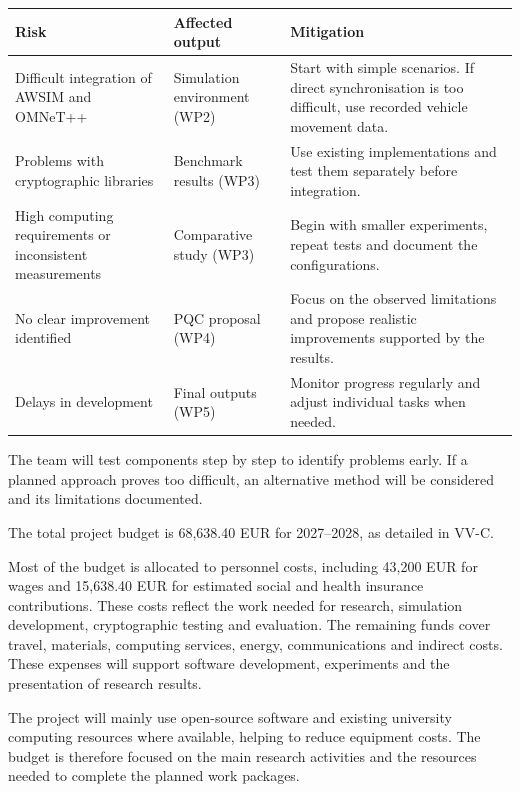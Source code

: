 \documentclass[10pt,a4paper]{article}
\newcommand{\medsec}[1]{\par\needspace{3\baselineskip}\vspace{6pt}\noindent{\large\sffamily\bfseries\color{navy}#1}\par\vspace{3pt}}
\begin{document}
\par\medskip\noindent\small\begin{tabular}{@{}L{49.40mm}L{41.16mm}L{74.10mm}@{}}
\toprule
\textbf{Risk} & \textbf{Affected output} & \textbf{Mitigation} \\
\midrule
Difficult integration of AWSIM and OMNeT++ & Simulation environment (WP2) & Start with simple scenarios. If direct synchronisation is too difficult, use recorded vehicle movement data. \\
Problems with cryptographic libraries & Benchmark results (WP3) & Use existing implementations and test them separately before integration. \\
High computing requirements or inconsistent measurements & Comparative study (WP3) & Begin with smaller experiments, repeat tests and document the configurations. \\
No clear improvement identified & PQC proposal (WP4) & Focus on the observed limitations and propose realistic improvements supported by the results. \\
Delays in development & Final outputs (WP5) & Monitor progress regularly and adjust individual tasks when needed. \\
\bottomrule\end{tabular}\normalsize\par\medskip
The team will test components step by step to identify problems early. If a planned approach proves too difficult, an alternative method will be considered and its limitations documented.\par

\medsec{3.4 Budget Justification}
The total project budget is 68,638.40 EUR for 2027--2028, as detailed in VV-C.\par

Most of the budget is allocated to personnel costs, including 43,200 EUR for wages and 15,638.40 EUR for estimated social and health insurance contributions. These costs reflect the work needed for research, simulation development, cryptographic testing and evaluation. The remaining funds cover travel, materials, computing services, energy, communications and indirect costs. These expenses will support software development, experiments and the presentation of research results.\par

The project will mainly use open-source software and existing university computing resources where available, helping to reduce equipment costs. The budget is therefore focused on the main research activities and the resources needed to complete the planned work packages.\par
\end{document}
